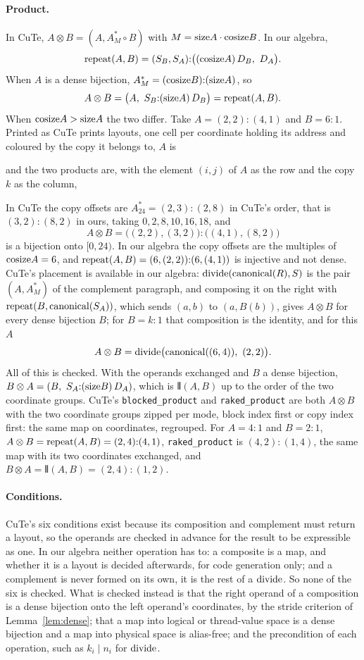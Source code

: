 \paragraph{Product.} In CuTe, $A \otimes B = (A, A^{*}_{M} \circ B)$ with
$M = \mathrm{size} A \cdot \mathrm{cosize} B$. In our algebra,
\[
\mathrm{repeat}(A,B) = (S_B, S_A){:}\big((\mathrm{cosize} A)\,D_B,\ D_A\big).
\]
When $A$ is a dense bijection, $A^{*}_{M} = (\mathrm{cosize} B){:}(\mathrm{size} A)$, so
\[
A \otimes B = \big(A,\ S_B{:}(\mathrm{size} A)\,D_B\big) = \mathrm{repeat}(A,B).
\]
When $\mathrm{cosize} A > \mathrm{size} A$ the two differ. Take $A = (2,2){:}(4,1)$ and
$B = 6{:}1$. Printed as CuTe prints layouts, one cell per coordinate holding
its address and coloured by the copy it belongs to, $A$ is

and the two products are, with the element $(i,j)$ of $A$ as the row and the
copy $k$ as the column,

In CuTe the copy offsets are $A^{*}_{24} = (2,3){:}(2,8)$ in CuTe's order,
that is $(3,2){:}(8,2)$ in ours, taking $0, 2, 8, 10, 16, 18$, and
\[
A \otimes B = \big((2,2),(3,2)\big){:}\big((4,1),(8,2)\big)
\]
is a bijection onto $[0,24)$. In our algebra the copy offsets are the multiples of
$\mathrm{cosize} A = 6$, and $\mathrm{repeat}(A,B) = (6,(2,2)){:}(6,(4,1))$ is injective and
not dense. CuTe's placement is available in our algebra:
$\mathrm{divide}(\mathrm{canonical}(R), S)$ is the pair $(A, A^{*}_{M})$ of the
complement paragraph, and composing it on the right with
$\mathrm{repeat}(B, \mathrm{canonical}(S_A))$, which sends $(a,b)$ to $(a, B(b))$,
gives $A \otimes B$ for every dense bijection $B$; for $B = k{:}1$ that
composition is the identity, and for this $A$
\[
A \otimes B = \mathrm{divide}\big(\mathrm{canonical}((6,4)),\ (2,2)\big).
\]
All of this is checked. With the
operands exchanged and $B$ a dense bijection, $B \otimes A = (B,\
S_A{:}(\mathrm{size} B)\,D_A)$, which is $\interleave(A,B)$ up to the order of the
two coordinate groups. CuTe's \texttt{blocked\_product} and
\texttt{raked\_product} are both $A \otimes B$ with the two coordinate groups
zipped per mode, block index first or copy index first: the same map on
coordinates, regrouped. For $A = 4{:}1$ and $B = 2{:}1$, $A \otimes B =
\mathrm{repeat}(A,B) = (2,4){:}(4,1)$, \texttt{raked\_product} is $(4,2){:}(1,4)$,
the same map with its two coordinates exchanged, and $B \otimes A =
\interleave(A,B) = (2,4){:}(1,2)$.

\paragraph{Conditions.} CuTe's six conditions exist because its composition
and complement must return a layout, so the operands are checked in advance
for the result to be expressible as one. In our algebra neither operation has
to: a composite is a map, and whether it is a layout is decided afterwards,
for code generation only; and a complement is never formed on its own, it is
the rest of a $\mathrm{divide}$. So none of the six is checked. What is checked
instead is that the right operand of a composition is a dense bijection onto
the left operand's coordinates, by the stride criterion of
Lemma~\ref{lem:dense}; that a map into logical or thread-value space is a
dense bijection and a map into physical space is alias-free; and the
precondition of each operation, such as $k_i \mid n_i$ for $\mathrm{divide}$.

